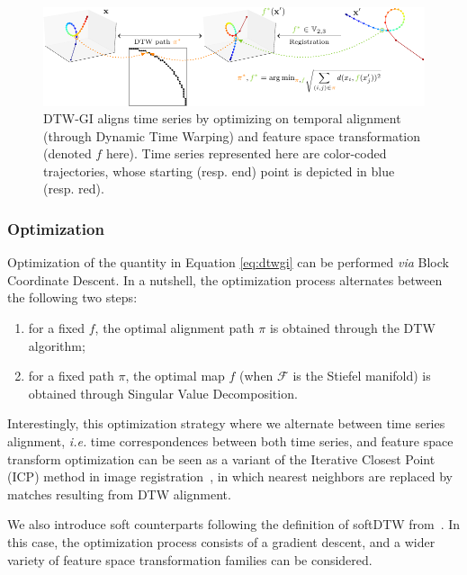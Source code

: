 \begin{figure}[t]
    \includegraphics[width=\linewidth]{fig/dtw_gi_cropped}
    \caption{DTW-GI aligns time series by optimizing on temporal alignment
    (through Dynamic Time Warping) and feature space transformation (denoted
    $f$ here). Time series represented here are color-coded trajectories, whose
    starting (resp. end) point is depicted in blue (resp. red).}
    \label{fig:dtw-gi}
\end{figure}



\subsubsection{Optimization}

Optimization of the quantity in Equation \eqref{eq:dtwgi} can be performed
\emph{via} Block Coordinate Descent.
In a nutshell, the optimization process alternates between the following
two steps:

\begin{enumerate}
\item for a fixed $f$, the optimal alignment path $\pi$ is obtained through the
DTW algorithm;
\item for a fixed path $\pi$, the optimal map $f$ (when $\mathcal{F}$ is the
Stiefel manifold) is obtained through Singular Value Decomposition.
\end{enumerate}

Interestingly, this optimization strategy where we alternate between time
series alignment, \emph{i.e.} time correspondences between both time series, and
feature space transform optimization can be seen as a variant of the Iterative
Closest Point (ICP) method in image registration~\cite{CHEN1992145}, in
which  nearest neighbors are replaced by matches resulting from DTW alignment.

We also introduce soft counterparts following the definition of softDTW
from~\cite{cuturi2017soft}.
In this case, the optimization process consists of a gradient descent, and a
wider variety of
feature space transformation families can be considered.

